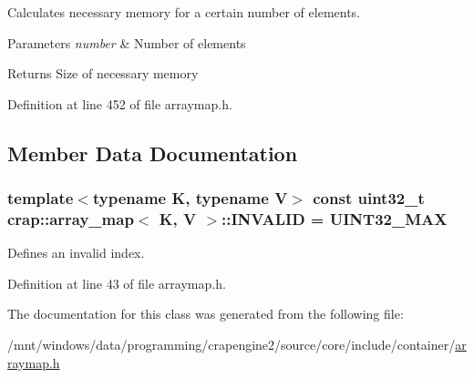 Calculates necessary memory for a certain number of elements. 


\begin{DoxyParams}{Parameters}
{\em number} & Number of elements \\
\hline
\end{DoxyParams}
\begin{DoxyReturn}{Returns}
Size of necessary memory 
\end{DoxyReturn}


Definition at line 452 of file arraymap.\+h.



\subsection{Member Data Documentation}
\hypertarget{classcrap_1_1array__map_af3441f93d975dab3aead6ba30e8ddf67}{
\subsubsection[{I\+N\+V\+A\+L\+I\+D}]{\setlength{\rightskip}{0pt plus 5cm}template$<$typename K, typename V$>$ const uint32\+\_\+t {\bf crap\+::array\+\_\+map}$<$ K, V $>$\+::I\+N\+V\+A\+L\+I\+D = {\bf U\+I\+N\+T32\+\_\+\+M\+A\+X}\hspace{0.3cm}{\ttfamily [static]}}}\label{classcrap_1_1array__map_af3441f93d975dab3aead6ba30e8ddf67}


Defines an invalid index. 



Definition at line 43 of file arraymap.\+h.



The documentation for this class was generated from the following file\+:\begin{DoxyCompactItemize}
\item 
/mnt/windows/data/programming/crapengine2/source/core/include/container/\hyperlink{arraymap_8h}{arraymap.\+h}\end{DoxyCompactItemize}
